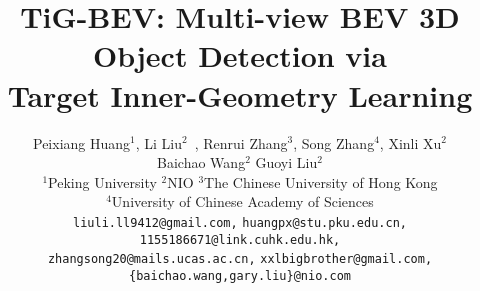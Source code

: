 \documentclass[10pt,twocolumn,letterpaper]{article}
\begin{document}

\title{TiG-BEV: Multi-view BEV 3D Object Detection via\\Target Inner-Geometry Learning}




\author{Peixiang Huang$^{1}$\footnotemark[2]\;,\;
Li Liu$^{2}$\footnotemark[2]\, \footnotemark[4]\;,\;
Renrui Zhang$^{3}$\footnotemark[2]\;,\;
Song Zhang$^{4}$\;,\;
Xinli Xu$^{2}$\;\;\\
Baichao Wang$^{2}$\;\;
Guoyi Liu$^{2}$\vspace{0.2cm}\\
$^1$Peking University\;
$^2$NIO\;
$^3$The Chinese University of Hong Kong\;\\
$^4$University of Chinese Academy of Sciences\\%
{\tt\small liuli.ll9412@gmail.com,}\;
{\tt\small huangpx@stu.pku.edu.cn,}\;
{\tt\small 1155186671@link.cuhk.edu.hk,}\;\\
{\tt\small zhangsong20@mails.ucas.ac.cn,}\;
{\tt\small xxlbigbrother@gmail.com,}\;
{\tt\small \{baichao.wang,gary.liu\}@nio.com}\\
}
\maketitle


\end{document}
